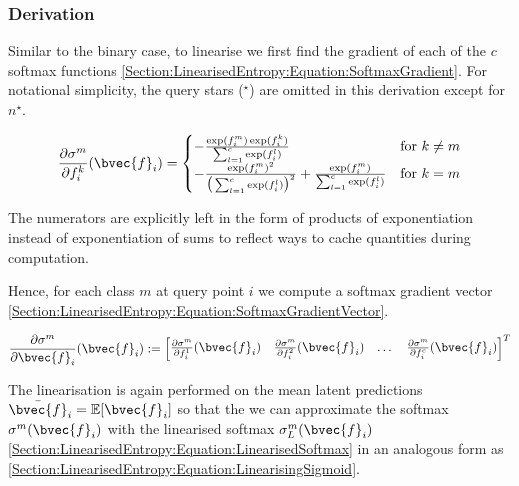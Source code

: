 			\subsubsection{Derivation}
			
				Similar to the binary case, to linearise we first find the gradient of each of the $c$ softmax functions \eqref{Section:LinearisedEntropy:Equation:SoftmaxGradient}. For notational simplicity, the query stars ($^{\star}$) are omitted in this derivation except for $n^{\star}$.
				
				\begin{equation}
					\frac{\partial \sigma^{m}}{\partial f^{k}_{i}}(\bvec{f}_{i}) =
					\begin{cases} 
						- \frac{\exp(f^{m}_{i}) \exp(f^{k}_{i})}{\sum_{l = 1}^{c} \exp(f^{l}_{i})} & \text{for } k \neq m  \\
						- \frac{\exp(f^{m}_{i})^{2}}{\big(\sum_{l = 1}^{c} \exp(f^{l}_{i})\big)^{2}} + \frac{\exp(f^{m}_{i})}{\sum_{l = 1}^{c} \exp(f^{l}_{i})}& \text{for } k = m
					\end{cases}
				\label{Section:LinearisedEntropy:Equation:SoftmaxGradient}
				\end{equation}			
			
				The numerators are explicitly left in the form of products of exponentiation instead of exponentiation of sums to reflect ways to cache quantities during computation. 
				
				Hence, for each class $m$ at query point $i$ we compute a softmax gradient vector \eqref{Section:LinearisedEntropy:Equation:SoftmaxGradientVector}.
				
				\begin{equation}
					\frac{\partial \sigma^{m}}{\partial \bvec{f}_{i}}(\bvec{f}_{i}) := \begin{bmatrix} \frac{\partial \sigma^{m}}{\partial f^{1}_{i}}(\bvec{f}_{i}) & \frac{\partial \sigma^{m}}{\partial f^{2}_{i}}(\bvec{f}_{i}) & \dots & \frac{\partial \sigma^{m}}{\partial f^{c}_{i}}(\bvec{f}_{i}) \end{bmatrix}^{T}
				\label{Section:LinearisedEntropy:Equation:SoftmaxGradientVector}
				\end{equation}
				
				The linearisation is again performed on the mean latent predictions $\bar{\bvec{f}}_{i} = \mathbb{E}[\bvec{f}_{i}]$ so that the we can approximate the softmax $\sigma^{m}(\bvec{f}_{i})$ with the linearised softmax $\sigma^{m}_{L}(\bvec{f}_{i})$ \eqref{Section:LinearisedEntropy:Equation:LinearisedSoftmax} in an analogous form as \eqref{Section:LinearisedEntropy:Equation:LinearisingSigmoid}.
				

